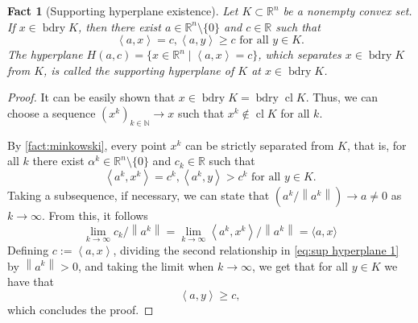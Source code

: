 \documentclass[smallextended,numbook,nospthms]{svjour3}
\theoremstyle{plain}
\newtheorem{fact}[theorem]{Fact}
\theoremstyle{definition}
\def\RR{\mathds R}
\def\NN{\mathds N}
\newcommand{\scal}[2]{\left\langle{#1},{#2}  \right\rangle}
\begin{document}
\begin{fact}[Supporting hyperplane existence]\label{fact:sup hyperplane}
Let $K \subset \RR^{n}$ be a nonempty convex set. If $x \in \operatorname{bdry} K$, then there exist $a \in \RR^{n} \setminus \{0\}$ and $c \in \RR$ such that
\[
\scal{a}{x}=c, \scal{a}{y}\geq c \text{ for all } y \in K.
\]
The hyperplane $H(a,c)=\{x \in \RR^n \mid \scal{a}{x}=c\}$, which separates $x \in \operatorname{bdry} K$ from $K$, is called the \emph{supporting hyperplane} of $K$ at $x \in \operatorname{bdry} K$. 
\end{fact}
\begin{proof}
	It can be easily shown that $x \in \operatorname{bdry} K=\operatorname{bdry} \operatorname{cl} K$. Thus, we can choose a sequence $(x^k)_{k \in \NN} \rightarrow x$ such that $x^{k} \notin \operatorname{cl} K$ for all $k$. 	
	
	By \cref{fact:minkowski}, every point $x^{k}$ can be strictly separated from $K$, that is, for all $k$ there exist $\alpha^k \in \RR^n \setminus \{0\}$ and $c_k \in \RR$ such that
	\[
	\scal{a^{k}}{x^{k}}=c^{k}, \scal{a^{k}}{y}>c^{k} \text{ for all } y \in K. \label{eq:sup hyperplane 1}
	\]
	Taking a subsequence, if necessary, we can state that $\left (a^{k} /\left\|a^{k}\right\|\right) \rightarrow a \neq 0$ as $k \rightarrow \infty$. From this, it follows
	\[
	\lim _{k \rightarrow \infty} c_{k}/\left\|a^{k}\right\|=\lim _{k \rightarrow \infty}\scal{a^k}{x^k}/\left\|a^{k}\right\|=\langle a, x\rangle
	\]
	Defining $c:=\scal{a}{x}$, dividing the second relationship in \cref{eq:sup hyperplane 1} by $\left\|a^{k}\right\|>0$, and taking the limit when $k \rightarrow \infty$, we get that for all $y \in K$ we have that
	\[
	\scal{a}{y}\geq c,
	\]
	which concludes the proof.
\end{proof}
\end{document}
